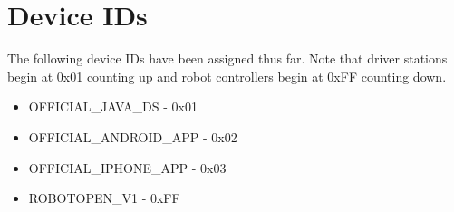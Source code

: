 \documentclass[11pt]{article} %
\begin{document}
\section*{}

\section{Device IDs}

The following device IDs have been assigned thus far. Note that driver stations begin at 0x01 counting up and robot controllers begin at 0xFF counting down.

\begin{itemize}
\item OFFICIAL\_JAVA\_DS - 0x01
\item OFFICIAL\_ANDROID\_APP - 0x02
\item OFFICIAL\_IPHONE\_APP - 0x03
\item ROBOTOPEN\_V1 - 0xFF
\end{itemize}
\end{document}
